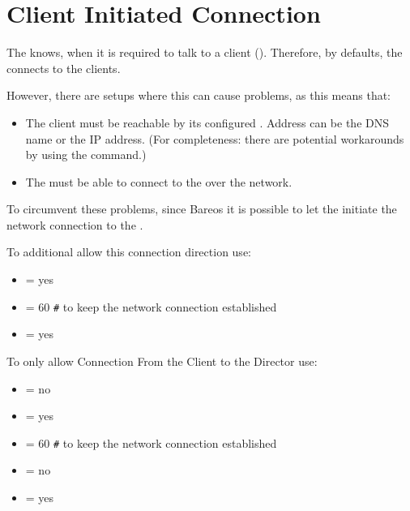 \section{Client Initiated Connection}
\label{sec:ClientInitiatedConnection}

The \bareosDir knows, when it is required to talk to a client (\bareosFd).
Therefore, by defaults, the \bareosDir connects to the clients.

However, there are setups where this can cause problems, as this means that:
\begin{itemize}
    \item The client must be reachable by its configured . Address can be the DNS name or the IP address. (For completeness: there are potential workarounds by using the  command.)
    \item The \bareosDir must be able to connect to the \bareosFd over the network.
\end{itemize}

To circumvent these problems, since Bareos  it is possible to let the \bareosFd initiate the network connection to the \bareosDir.

To additional allow this connection direction use:
\begin{itemize}
  \item {} = yes
  \item {} = 60 \verb|#| to keep the network connection established
  \item {} = yes
\end{itemize}

To only allow Connection From the Client to the Director use:
\begin{itemize}
  \item {} = no
  \item {} = yes
  \item {} = 60 \verb|#| to keep the network connection established
  \item {} = no
  \item {} = yes
\end{itemize}

